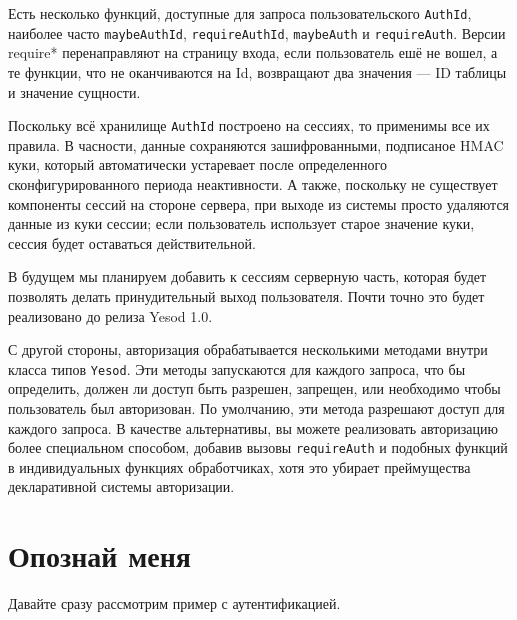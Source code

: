 Есть несколько функций, доступные для запроса пользовательского \lstinline'AuthId', наиболее часто \lstinline'maybeAuthId', \lstinline'requireAuthId', \lstinline'maybeAuth' и \lstinline'requireAuth'. Версии require* перенаправляют на страницу входа, если пользователь ешё не вошел, а те функции, что не оканчиваются на Id, возвращают два значения --- ID таблицы и значение сущности.

Поскольку всё хранилище \lstinline'AuthId' построено на сессиях, то применимы все их правила. В часности, данные сохраняются зашифрованными, подписаное HMAC куки, который автоматически устаревает после определенного сконфигурированного периода неактивности. А также, поскольку не существует компоненты сессий на стороне сервера, при выходе из системы просто удаляются данные из куки сессии; если пользователь использует старое значение куки, сессия будет оставаться действительной.

\begin{remark}
В будущем мы планируем добавить к сессиям серверную часть, которая будет позволять делать принудительный выход пользователя. Почти точно это будет реализовано до релиза Yesod 1.0.
\end{remark}

С другой стороны, авторизация обрабатывается несколькими методами внутри класса типов \lstinline'Yesod'. Эти методы запускаются для каждого запроса, что бы определить, должен ли доступ быть разрешен, запрещен, или необходимо чтобы пользователь был авторизован. По умолчанию, эти метода разрешают доступ для каждого запроса. В качестве альтернативы, вы можете реализовать авторизацию более специальном способом, добавив вызовы \lstinline'requireAuth' и подобных функций в индивидуальных функциях обработчиках, хотя это убирает преймущества декларативной системы авторизации.

\section{Опознай меня}

Давайте сразу рассмотрим пример с аутентификацией.

